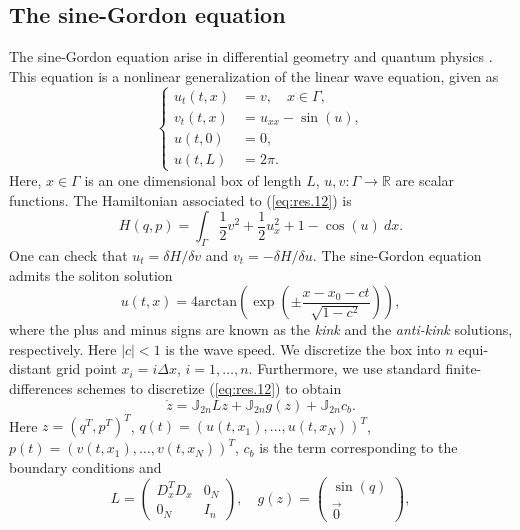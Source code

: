 \subsection{The sine-Gordon equation} \label{sec:res.2}
The sine-Gordon equation arise in differential geometry and quantum physics \cite{Misumi2015}. This equation is a nonlinear generalization of the linear wave equation, given as
\begin{equation} \label{eq:res.12}
\left\{
\begin{aligned}
	u_{t}(t,x) &= v, \quad x\in \Gamma,\\
	v_t(t,x) &= u_{xx} - \sin(u), \\
	u(t,0) &= 0, \\
	u(t,L) &= 2\pi.
\end{aligned}
\right.
\end{equation}
Here, $x\in \Gamma$ is an one dimensional box of length $L$, $u,v: \Gamma \to \mathbb R$ are scalar functions. The Hamiltonian associated to (\ref{eq:res.12}) is
\begin{equation} \label{eq:res.13}
	H(q,p) = \int_{\Gamma} \frac 1 2 v^2 + \frac 1 2 u_x^2 + 1 - \cos(u) \ dx.
\end{equation}
One can check that $u_{t} = \delta H / \delta v$ and $v_{t} = - \delta H / \delta u$. The sine-Gordon equation admits the soliton solution
\begin{equation} \label{eq:res.14}
	u(t,x) = 4 \text{arctan}\left( \exp \left( \pm \frac{x - x_0 - ct}{\sqrt{1-c^2}} \right) \right),
\end{equation}
where the plus and minus signs are known as the \emph{kink} and the \emph{anti-kink} solutions, respectively. Here $|c|<1$ is the wave speed. We discretize the box into $n$ equi-distant grid point $x_i = i\Delta x$, $i=1,\dots,n$. Furthermore, we use standard finite-differences schemes to discretize (\ref{eq:res.12}) to obtain
\begin{equation} \label{eq:res.15}
	\dot z = \mathbb J_{2n} L z + \mathbb J_{2n} g(z) + \mathbb J_{2n} c_b.
\end{equation}
Here $z = (q^T,p^T)^T$, $q(t) = (u(t,x_1),\dots,u(t,x_N))^T$, $p(t) = (v(t,x_1),\dots,v(t,x_N))^T$, $c_b$ is the term corresponding to the boundary conditions and
\begin{equation} \label{eq:res.16}
	L = 
	\begin{pmatrix}
		D_x^TD_x & 0_N \\
		0_N & I_n
	\end{pmatrix}, 
	\quad
	g(z) = 
	\begin{pmatrix}
	\sin(q) \\
	\vec 0
	\end{pmatrix},
\end{equation}
